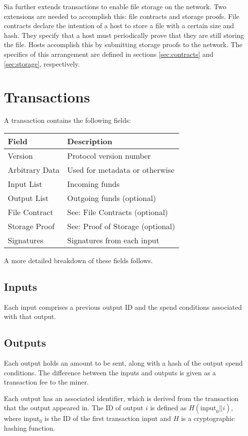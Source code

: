 \documentclass[twocolumn]{article}
\begin{document}
Sia further extends transactions to enable file storage on the network.
Two extensions are needed to accomplish this: file contracts and storage proofs.
File contracts declare the intention of a host to store a file with a certain size and hash.
They specify that a host must periodically prove that they are still storing the file.
Hosts accomplish this by submitting storage proofs to the network.
The specifics of this arrangement are defined in sections \ref{sec:contracts} and \ref{sec:storage}, respectively.

\section{Transactions}
A transaction contains the following fields:
\begin{tabular}{| l | l |}
	\hline
	\textbf{Field} & \textbf{Description} \\ \hline
	Version        & Protocol version number \\ \hline
	Arbitrary Data & Used for metadata or otherwise \\ \hline
	Input List     & Incoming funds \\ \hline
	Output List    & Outgoing funds (optional) \\ \hline
	File Contract  & See: File Contracts (optional) \\ \hline
	Storage Proof  & See: Proof of Storage (optional) \\ \hline
	Signatures     & Signatures from each input \\ \hline
\end{tabular}

A more detailed breakdown of these fields follows.

\subsection{Inputs}
Each input comprises a previous output ID and the spend conditions associated with that output.

\subsection{Outputs}
Each output holds an amount to be sent, along with a hash of the output spend conditions.
The difference between the inputs and outputs is given as a transaction fee to the miner.

Each output has an associated identifier, which is derived from the transaction that the output appeared in.
The ID of output $i$ is defined as $H(\text{input}_0 || i)$,
where input$_0$ is the ID of the first transaction input and $H$ is a cryptographic hashing function.
\end{document}

